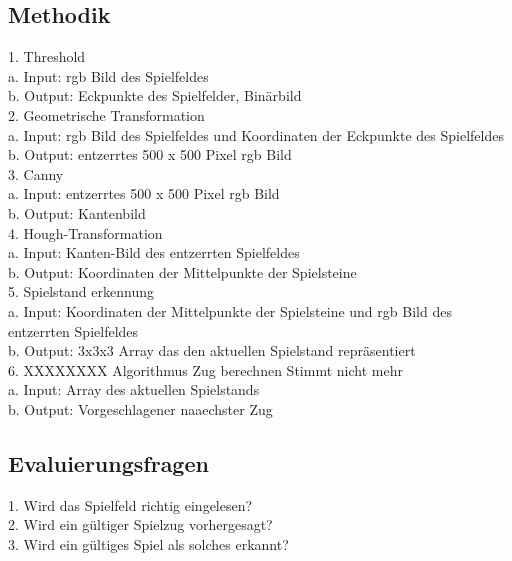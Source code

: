 \documentclass[paper=A4, deutsch]{scrartcl}
\begin{document}
\subsection{Methodik}
1.  Threshold\\
\hspace*{1em} a. Input: rgb Bild des Spielfeldes\\
\hspace*{1em} b. Output: Eckpunkte des Spielfelder, Binärbild\\
2. Geometrische Transformation\\
\hspace*{1em} a. Input: rgb Bild des Spielfeldes und Koordinaten der Eckpunkte des Spielfeldes\\
\hspace*{1em} b. Output: entzerrtes 500 x 500 Pixel rgb Bild\\
3. Canny\\
\hspace*{1em} a. Input: entzerrtes 500 x 500 Pixel rgb Bild\\
\hspace*{1em} b. Output: Kantenbild \\
4. Hough-Transformation \\
\hspace*{1em} a. Input: Kanten-Bild des entzerrten Spielfeldes\\
\hspace*{1em} b. Output: Koordinaten der Mittelpunkte der Spielsteine \\
5. Spielstand erkennung \\
\hspace*{1em} a. Input: Koordinaten der Mittelpunkte der Spielsteine und rgb Bild des entzerrten Spielfeldes\\
\hspace*{1em} b. Output: 3x3x3 Array das den aktuellen Spielstand repräsentiert \\
6. XXXXXXXX Algorithmus Zug berechnen Stimmt nicht mehr\\
\hspace*{1em} a. Input: Array des aktuellen Spielstands \\
\hspace*{1em} b. Output: Vorgeschlagener naaechster Zug

\subsection{Evaluierungsfragen}
1. Wird das Spielfeld richtig eingelesen?\\
2. Wird ein gültiger Spielzug vorhergesagt?\\
3. Wird ein gültiges Spiel als solches erkannt?\\
\end{document}
